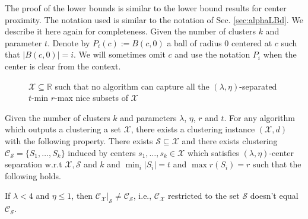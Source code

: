 \documentclass[anon,12pt]{colt2016} %
\newcommand{\mc}{\mathcal}
\begin{document}
\noindent The proof of the lower bounds is similar to the lower bound results for center proximity. The notation used is similar to the notation of Sec. \ref{sec:alphaLBd}. We describe it here again for completeness. Given the number of clusters $k$ and parameter $t$. Denote by $P_{i}(c) := B(c, 0)$ a ball of radius $0$ centered at $c$ such that $|B(c, 0)| = i$. We will sometimes omit $c$ and use the notation $P_i$ when the center is clear from the context. 

\begin{figure}[!ht]

\caption{$\mc X \subseteq \mathbb{R}$ such that no algorithm can capture all the $(\lambda, \eta)$-separated $t$-min $r$-max nice subsets of $\mc X$}
\label{fig:noalglambdacs}
\end{figure}

\begin{theorem}
Given the number of clusters $k$ and parameters $\lambda$, $\eta$, $r$ and $t$. For any algorithm which outputs a clustering a set $\mc X$, there exists a clustering instance $(\mc X, d)$ with the following property. There exists $\mc S \subseteq \mc X$ and there exists clustering $\mc C_{\mc S} = \{S_1, \ldots, S_k\}$ induced by centers $s_1, \ldots, s_k \in \mc X$ which satisfies $(\lambda, \eta)$-center separation w.r.t $\mc X, \mc S$ and $k$ and $\min_i |S_i| = t$ and $\max r(S_i) = r$ such that the following holds.

If $\lambda < 4$ and $\eta \le 1$, then $\mc C_{\mc X}|_{\mc S} \neq \mc C_{\mc S}$, i.e., $\mc C_{\mc X}$ restricted to the set $\mc S$ doesn't equal $\mc C_{\mc S}$.
\end{theorem}
\end{document}
